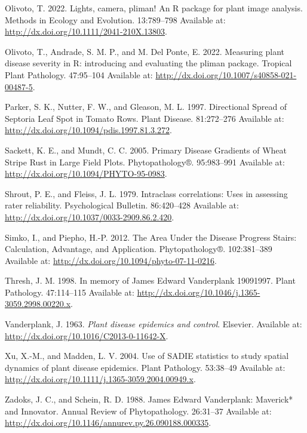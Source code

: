 \documentclass[
  letterpaper,
  DIV=11,
  numbers=noendperiod]{scrreprt}
\newlength{\cslhangindent}
\newlength{\cslentryspacingunit} %
\newenvironment{CSLReferences}[2] %
 {%
  \setlength{\parindent}{0pt}
  \ifodd #1
  \let\oldpar\par
  \def\par{\hangindent=\cslhangindent\oldpar}
  \fi
  \setlength{\parskip}{#2\cslentryspacingunit}
 }%
 {}
\begin{document}
\begin{CSLReferences}{0}{0}
\leavevmode{}%
Olivoto, T. 2022. Lights, camera, pliman! An R package for plant image
analysis. Methods in Ecology and Evolution. 13:789--798 Available at:
\url{http://dx.doi.org/10.1111/2041-210X.13803}.

\leavevmode{}%
Olivoto, T., Andrade, S. M. P., and M. Del Ponte, E. 2022. Measuring
plant disease severity in R: introducing and evaluating the pliman
package. Tropical Plant Pathology. 47:95--104 Available at:
\url{http://dx.doi.org/10.1007/s40858-021-00487-5}.

\leavevmode{}%
Parker, S. K., Nutter, F. W., and Gleason, M. L. 1997. Directional
Spread of Septoria Leaf Spot in Tomato Rows. Plant Disease. 81:272--276
Available at: \url{http://dx.doi.org/10.1094/pdis.1997.81.3.272}.

\leavevmode{}%
Sackett, K. E., and Mundt, C. C. 2005. Primary Disease Gradients of
Wheat Stripe Rust in Large Field Plots. Phytopathology®. 95:983--991
Available at: \url{http://dx.doi.org/10.1094/PHYTO-95-0983}.

\leavevmode{}%
Shrout, P. E., and Fleiss, J. L. 1979. Intraclass correlations: Uses in
assessing rater reliability. Psychological Bulletin. 86:420--428
Available at: \url{http://dx.doi.org/10.1037/0033-2909.86.2.420}.

\leavevmode{}%
Simko, I., and Piepho, H.-P. 2012. The Area Under the Disease Progress
Stairs: Calculation, Advantage, and Application. Phytopathology®.
102:381--389 Available at:
\url{http://dx.doi.org/10.1094/phyto-07-11-0216}.

\leavevmode{}%
Thresh, J. M. 1998. In memory of James Edward Vanderplank
1909{\textendash}1997. Plant Pathology. 47:114--115 Available at:
\url{http://dx.doi.org/10.1046/j.1365-3059.2998.00220.x}.

\leavevmode{}%
Vanderplank, J. 1963. \emph{Plant disease epidemics and control}.
Elsevier. Available at: \url{http://dx.doi.org/10.1016/C2013-0-11642-X}.

\leavevmode{}%
Xu, X.-M., and Madden, L. V. 2004. Use of {SADIE} statistics to study
spatial dynamics of plant disease epidemics. Plant Pathology. 53:38--49
Available at: \url{http://dx.doi.org/10.1111/j.1365-3059.2004.00949.x}.

\leavevmode{}%
Zadoks, J. C., and Schein, R. D. 1988. James Edward Vanderplank:
Maverick* and Innovator. Annual Review of Phytopathology. 26:31--37
Available at:
\url{http://dx.doi.org/10.1146/annurev.py.26.090188.000335}.

\end{CSLReferences}
\end{document}
